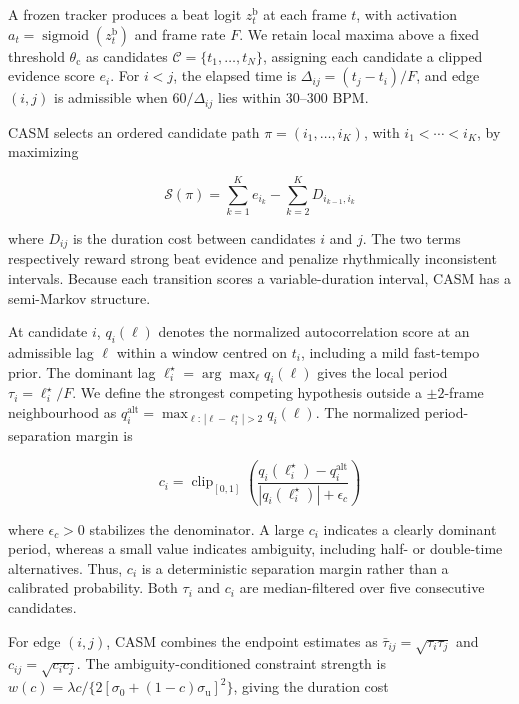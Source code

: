 \documentclass{article}
\newif\ifshowchanges
\newcommand{\rev}[1]{%
  \ifshowchanges
    \textcolor{red}{#1}%
  \else
    #1%
  \fi
}
\begin{document}
\rev{A frozen tracker produces a beat logit $z_t^{\mathrm b}$ at each
frame $t$, with activation
$a_t=\operatorname{sigmoid}(z_t^{\mathrm b})$ and frame rate $F$.
We retain local maxima above a fixed threshold $\theta_{\mathrm c}$ as
candidates $\mathcal C=\{t_1,\ldots,t_N\}$, assigning each candidate a
clipped evidence score $e_i$. For $i<j$, the elapsed time is
$\Delta_{ij}=(t_j-t_i)/F$, and edge $(i,j)$ is admissible when
$60/\Delta_{ij}$ lies within 30--300 BPM.}

\rev{CASM selects an ordered candidate path
$\pi=(i_1,\ldots,i_K)$, with $i_1<\cdots<i_K$, by maximizing}

\begin{equation}
\rev{
\mathcal S(\pi)
=
\sum_{k=1}^{K} e_{i_k}
-
\sum_{k=2}^{K}D_{i_{k-1},i_k}
}
\label{eq:casm-objective}
\end{equation}

\rev{where $D_{ij}$ is the duration cost between candidates $i$ and $j$.
The two terms respectively reward strong beat evidence and penalize
rhythmically inconsistent intervals. Because each transition scores a
variable-duration interval, CASM has a semi-Markov structure.}

\rev{At candidate $i$, $q_i(\ell)$ denotes the normalized
autocorrelation score at an admissible lag $\ell$ within a window
centred on $t_i$, including a mild fast-tempo prior. The dominant lag
$\ell_i^\star=\arg\max_\ell q_i(\ell)$ gives the local period
$\tau_i=\ell_i^\star/F$. We define the strongest competing hypothesis
outside a $\pm2$-frame neighbourhood as
$q_i^{\mathrm{alt}}
=\max_{\ell:\,|\ell-\ell_i^\star|>2}q_i(\ell)$.
The normalized period-separation margin is}

\begin{equation}
\rev{
c_i =
\operatorname{clip}_{[0,1]}\!\left(
\frac{
q_i(\ell_i^\star)-q_i^{\mathrm{alt}}
}{
|q_i(\ell_i^\star)|+\epsilon_c
}
\right)
}
\label{eq:casm-reliability}
\end{equation}

\rev{where $\epsilon_c>0$ stabilizes the denominator. A large $c_i$
indicates a clearly dominant period, whereas a small value indicates
ambiguity, including half- or double-time alternatives. Thus, $c_i$ is
a deterministic separation margin rather than a calibrated
probability. Both $\tau_i$ and $c_i$ are median-filtered over five
consecutive candidates.}

\rev{For edge $(i,j)$, CASM combines the endpoint estimates as
$\bar{\tau}_{ij}=\sqrt{\tau_i\tau_j}$ and
$c_{ij}=\sqrt{c_i c_j}$. The ambiguity-conditioned constraint strength
is
$w(c)=\lambda c/\{2[\sigma_0+(1-c)\sigma_{\mathrm u}]^2\}$,
giving the duration cost}
\end{document}
